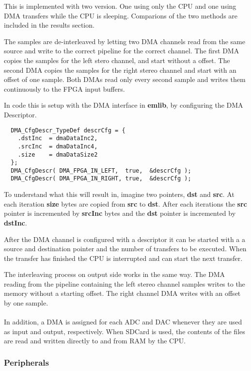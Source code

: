 This is implemented with two version. One using only the CPU and one using DMA transfers
while the CPU is sleeping. Comparions of the two methods are included in the results section.

The samples are de-interleaved by letting two DMA channels read from the same
source and write to the correct pipeline for the correct channel. The first DMA
copies the samples for the left stero channel, and start without a offset. The
second DMA copies the samples for the right stereo channel and start with an
offset of one sample. Both DMAs read only every second sample and writes them
continuously to the FPGA input buffers.

In code this is setup with the DMA interface in {\bf emlib}, by configuring the DMA Descriptor. 
\begin{lstlisting}
  DMA_CfgDescr_TypeDef descrCfg = {
    .dstInc  = dmaDataInc2,
    .srcInc  = dmaDataInc4,
    .size    = dmaDataSize2
  };
  DMA_CfgDescr( DMA_FPGA_IN_LEFT,  true,  &descrCfg );
  DMA_CfgDescr( DMA_FPGA_IN_RIGHT, true,  &descrCfg );
\end{lstlisting}
To understand what this will result in, imagine two pointers, {\bf dst} and {\bf src}. 
At each iteration {\bf size} bytes are copied from {\bf src} to {\bf dst}. After each
iterations the {\bf src} pointer is incremented by {\bf srcInc} bytes and the {\bf dst}
pointer is incremented by {\bf dstInc}. 

After the DMA channel is configured with a descriptor it can be started with a 
a source and destination pointer and the number of transfers to be executed. 
When the transfer has finished the CPU is interrupted and can start the next transfer.

The interleaving process on output side works in the same way. The DMA reading
from the pipeline containing the left stereo channel samples writes to the
memory without a starting offset. The right channel DMA writes with an offset by
one sample.

\paragraph{}
In addition, a DMA is assigned for each ADC and DAC whenever they are used as
input and output, respectively. When SDCard is used, the contents of the files
are read and written directly to and from RAM by the CPU.


\subsubsection{Peripherals}

